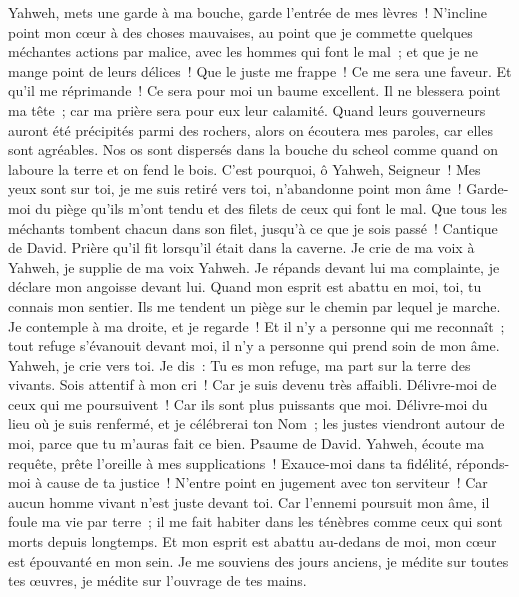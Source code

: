 \begin{multicols}{2}
Yahweh, mets une garde à ma bouche, garde l'entrée de mes lèvres~!
N'incline point mon cœur à des choses mauvaises, au point que je commette quelques méchantes actions par malice, avec les hommes qui font le mal~; et que je ne mange point de leurs délices~!
Que le juste me frappe~! Ce me sera une faveur. Et qu'il me réprimande~! Ce sera pour moi un baume excellent. Il ne blessera point ma tête~; car ma prière sera pour eux leur calamité.
Quand leurs gouverneurs auront été précipités parmi des rochers, alors on écoutera mes paroles, car elles sont agréables.
Nos os sont dispersés dans la bouche du scheol comme quand on laboure la terre et on fend le bois.
C'est pourquoi, ô Yahweh, Seigneur~! Mes yeux sont sur toi, je me suis retiré vers toi, n'abandonne point mon âme~!
Garde-moi du piège qu'ils m'ont tendu et des filets de ceux qui font le mal.
Que tous les méchants tombent chacun dans son filet, jusqu'à ce que je sois passé~!
\VerseOne{}Cantique de David. Prière qu'il fit lorsqu'il était dans la caverne.
Je crie de ma voix à Yahweh, je supplie de ma voix Yahweh.
Je répands devant lui ma complainte, je déclare mon angoisse devant lui.
Quand mon esprit est abattu en moi, toi, tu connais mon sentier. Ils me tendent un piège sur le chemin par lequel je marche.
Je contemple à ma droite, et je regarde~! Et il n'y a personne qui me reconnaît~; tout refuge s'évanouit devant moi, il n'y a personne qui prend soin de mon âme.
Yahweh, je crie vers toi. Je dis~: Tu es mon refuge, ma part sur la terre des vivants.
Sois attentif à mon cri~! Car je suis devenu très affaibli. Délivre-moi de ceux qui me poursuivent~! Car ils sont plus puissants que moi.
Délivre-moi du lieu où je suis renfermé, et je célébrerai ton Nom~; les justes viendront autour de moi, parce que tu m'auras fait ce bien.
\VerseOne{}Psaume de David. Yahweh, écoute ma requête, prête l'oreille à mes supplications~! Exauce-moi dans ta fidélité, réponds-moi à cause de ta justice~!
N'entre point en jugement avec ton serviteur~! Car aucun homme vivant n'est juste devant toi.
Car l'ennemi poursuit mon âme, il foule ma vie par terre~; il me fait habiter dans les ténèbres comme ceux qui sont morts depuis longtemps.
Et mon esprit est abattu au-dedans de moi, mon cœur est épouvanté en mon sein.
Je me souviens des jours anciens, je médite sur toutes tes œuvres, je médite sur l'ouvrage de tes mains.

\end{multicols}
